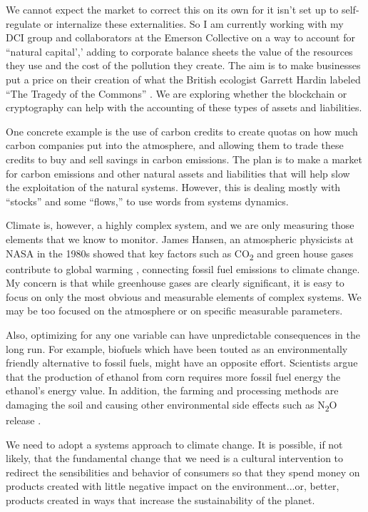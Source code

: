 We cannot expect the market to correct this on its own for it isn't set up to self-regulate or internalize these externalities. So I am currently working with my \ac{DCI} group and collaborators at the Emerson Collective on a way to account for ``natural capital',' adding to corporate balance sheets the value of the resources they use and the cost of the pollution they create. The aim is to make businesses put a price on their creation of what the British ecologist Garrett Hardin labeled ``The Tragedy of the Commons'' \cite{hardin1968tragedy}. We are exploring whether the blockchain or cryptography can help with the accounting of these types of assets and liabilities.

One concrete example is the use of carbon credits to create quotas on how much carbon companies put into the atmosphere, and allowing them to trade these credits to buy and sell savings in carbon emissions. The plan is to make a market for carbon emissions and other natural assets and liabilities that will help slow the exploitation of the natural systems. However, this is dealing mostly with ``stocks'' and some ``flows,'' to use words from systems dynamics.

Climate is, however, a highly complex system, and we are only measuring those elements that we know to monitor. James Hansen, an atmospheric physicists at \ac{NASA} in the 1980s showed that key factors such as CO\textsubscript{2} and green house gases contribute to global warming \cite{hansen1981climate}, connecting fossil fuel emissions to climate change. My concern is that while greenhouse gases are clearly significant, it is easy to focus on only the most obvious and measurable elements of complex systems. We may be too focused on the atmosphere or on specific measurable parameters. 

Also, optimizing for any one variable can have unpredictable consequences in the long run. For example, biofuels which have been touted as an environmentally friendly alternative to fossil fuels, might have an opposite effort. Scientists argue that the production of ethanol from corn requires more fossil fuel energy \cite{patzek2004thermodynamics} the ethanol's energy value. In addition, the farming and processing methods are damaging the soil and causing other environmental side effects such as N\textsubscript{2}O release \cite{crutzen2007n}.

We need to adopt a systems approach to climate change. It is possible, if not likely, that the fundamental change that we need is a cultural intervention to redirect the sensibilities and behavior of consumers so that they spend money on products created with little negative impact on the environment...or, better, products created in ways that increase the sustainability of the planet.

